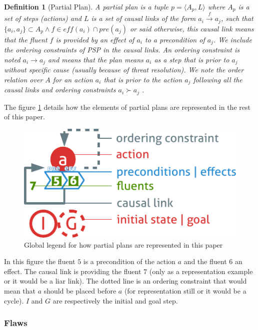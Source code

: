 \documentclass[]{article}
\newtheorem{definition}{Definition}
\begin{document}
\begin{definition}[Partial Plan]

A \emph{partial plan} is a tuple \(p = \langle A_p, L\rangle\) where
\(A_p\) is a set of steps (actions) and \(L\) is a set of causal links
of the form \(a_i \xrightarrow{f} a_j\), such that
\(\{ a_i, a_j \} \subset A_p \land f \in eff(a_i) \cap pre(a_j)\) or
said otherwise, this causal link means that the fluent \(f\) is provided
by an effect of \(a_i\) to a precondition of \(a_j\). We include the
ordering constraints of PSP in the causal links. An ordering constraint
is noted \(a_i \to a_j\) and means that the plan means \(a_i\) as a step
that is prior to \(a_j\) without specific cause (usually because of
threat resolution). We note the order relation over \(A\) for an action
\(a_i\) that is prior to the action \(a_j\) following all the causal
links and ordering constraints \(a_i \succ a_j\) .

\end{definition}

The figure \ref{fig:legend} details how the elements of partial plans
are represented in the rest of this paper.

\begin{figure}[htbp]
\centering
\includegraphics{graphics/legend.pdf}
\caption{Global legend for how partial plans are represented in this
paper\label{fig:legend}}
\end{figure}

In this figure the fluent \(5\) is a precondition of the action \(a\)
and the fluent \(6\) an effect. The causal link is providing the fluent
\(7\) (only as a representation example or it would be a liar link). The
dotted line is an ordering constraint that would mean that \(a\) should
be placed before \(a\) (for representation still or it would be a
cycle). \(I\) and \(G\) are respectively the initial and goal step.

\subsubsection{Flaws}\label{flaws}
\end{document}
